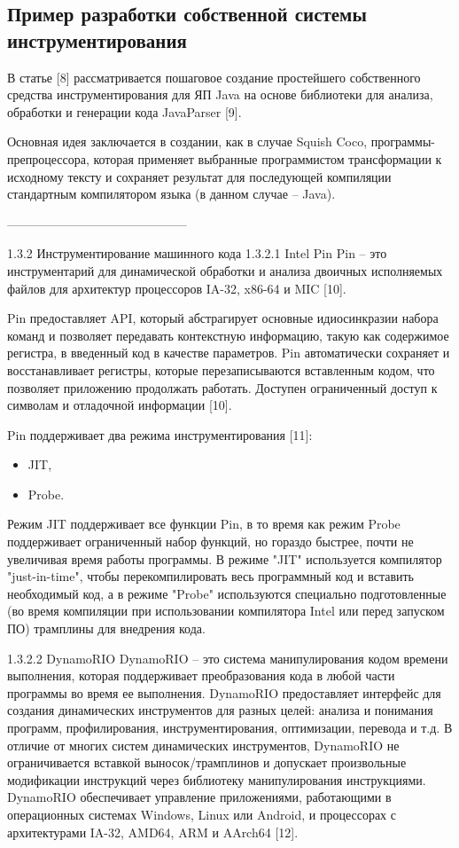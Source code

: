 \subsection{Пример разработки собственной системы инструментирования}
В статье [8] рассматривается пошаговое создание простейшего собственного средства инструментирования для ЯП Java на основе библиотеки для анализа, обработки и генерации кода JavaParser [9].

Основная идея заключается в создании, как в случае Squish Coco, программы-препроцессора, которая применяет выбранные программистом трансформации к исходному тексту и сохраняет результат для последующей компиляции стандартным компилятором языка (в данном случае -- Java).

--------------------------------------------

1.3.2 Инструментирование машинного кода
1.3.2.1 Intel Pin
Pin -- это инструментарий для динамической обработки и анализа двоичных исполняемых файлов для архитектур процессоров IA-32, x86-64 и MIC [10].

Pin предоставляет API, который абстрагирует основные идиосинкразии набора команд и позволяет передавать контекстную информацию, такую как содержимое регистра, в введенный код в качестве параметров. Pin автоматически сохраняет и восстанавливает регистры, которые перезаписываются вставленным кодом, что позволяет приложению продолжать работать. Доступен ограниченный доступ к символам и отладочной информации [10].

Pin поддерживает два режима инструментирования [11]:
\begin{itemize}
  \item JIT,
  \item Probe.
\end{itemize}

Режим JIT поддерживает все функции Pin, в то время как режим Probe поддерживает ограниченный набор функций, но гораздо быстрее, почти не увеличивая время работы программы. В режиме "JIT" используется компилятор "just-in-time", чтобы перекомпилировать весь программный код и вставить необходимый код, а в режиме "Probe" используются специально подготовленные (во время компиляции при использовании компилятора Intel или перед запуском ПО) трамплины для внедрения кода.

1.3.2.2 DynamoRIO
DynamoRIO -- это система манипулирования кодом времени выполнения, которая поддерживает преобразования кода в любой части программы во время ее выполнения. DynamoRIO предоставляет интерфейс для создания динамических инструментов для разных целей: анализа и понимания программ, профилирования, инструментирования, оптимизации, перевода и т.д. В отличие от многих систем динамических инструментов, DynamoRIO не ограничивается вставкой выносок/трамплинов и допускает произвольные модификации инструкций через библиотеку манипулирования инструкциями. DynamoRIO обеспечивает управление приложениями, работающими в операционных системах Windows, Linux или Android, и процессорах с архитектурами IA-32, AMD64, ARM и AArch64 [12].

